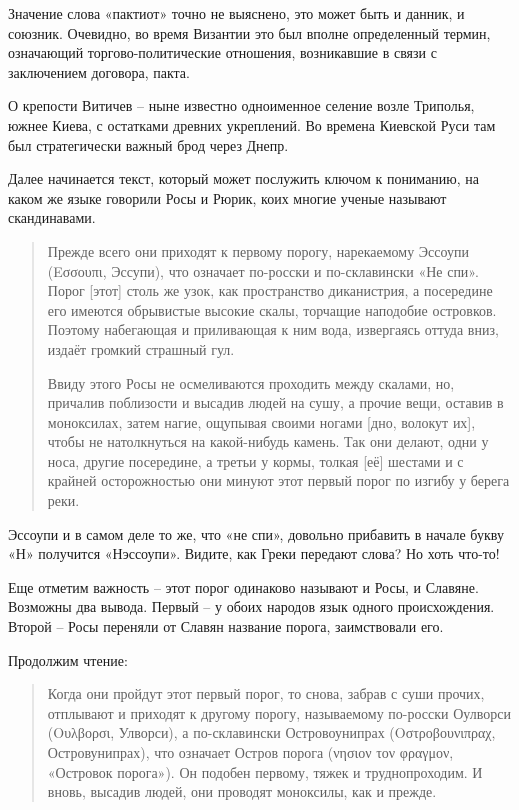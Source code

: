 Значение слова «пактиот» точно не выяснено, это может быть и данник, и союзник. Очевидно, во время Византии это был вполне определенный термин, означающий торгово-политические отношения, возникавшие в связи с заключением договора, пакта.

О крепости Витичев – ныне известно одноименное селение возле Триполья, южнее Киева, с остатками древних укреплений. Во времена Киевской Руси там был стратегически важный брод через Днепр.

Далее начинается текст, который может послужить ключом к пониманию, на каком же языке говорили Росы и Рюрик, коих многие ученые называют скандинавами.

\begin{quotation}
Прежде всего они приходят к первому порогу, нарекаемому Эссоупи (Εσσουπι, Эссупи), что означает по-росски и по-склавински «Не спи». Порог [этот] столь же узок, как пространство диканистрия, а посередине его имеются обрывистые высокие скалы, торчащие наподобие островков. Поэтому набегающая и приливающая к ним вода, извергаясь оттуда вниз, издаёт громкий страшный гул. 

Ввиду этого Росы не осмеливаются проходить между скалами, но, причалив поблизости и высадив людей на сушу, а прочие вещи, оставив в моноксилах, затем нагие, ощупывая своими ногами [дно, волокут их], чтобы не натолкнуться на какой-нибудь камень. Так они делают, одни у носа, другие посередине, а третьи у кормы, толкая [её] шестами и с крайней осторожностью они минуют этот первый порог по изгибу у берега реки. 
\end{quotation}

Эссоупи и в самом деле то же, что «не спи», довольно прибавить в начале букву «Н» получится  «Нэссоупи». Видите, как Греки передают слова? Но хоть что-то!

Еще отметим важность – этот порог одинаково называют и Росы, и Славяне. Возможны два вывода. Первый – у обоих народов язык одного происхождения. Второй – Росы переняли от Славян название порога, заимствовали его.

Продолжим чтение:

\begin{quotation}
Когда они пройдут этот первый порог, то снова, забрав с суши прочих, отплывают и приходят к другому порогу, называемому по-росски Оулворси (Ουλβορσι, Улворси), а по-склавински Островоунипрах (Οστροβουνιπραχ, Островунипрах), что означает Остров порога (νησιον τον φραγμον, «Островок порога»). Он подобен первому, тяжек и труднопроходим. И вновь, высадив людей, они проводят моноксилы, как и прежде. 
\end{quotation}

